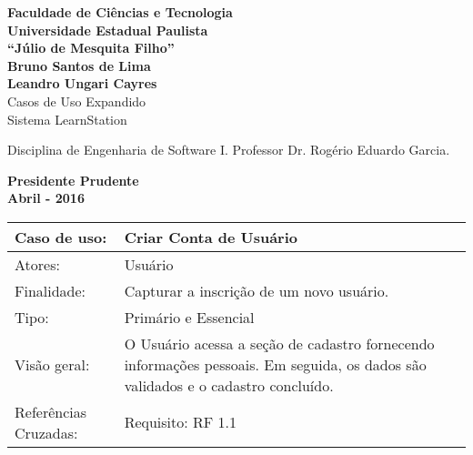 \documentclass[12pt,a4paper,onecolumn,titlepage]{article}
\begin{document}

\begin{titlepage} %
	
	\vfill
	\begin{center}
	
		{\large \textbf{Faculdade de Ciências e Tecnologia\\Universidade Estadual Paulista\\``Júlio de Mesquita Filho''}} \\[3cm]
		{\large \textbf{Bruno Santos de Lima}}\\
		{\large \textbf{Leandro Ungari Cayres}}\\[4cm]
		{\Large Casos de Uso Expandido}\\
		{\Large Sistema LearnStation}\\[4cm]

	\hspace{.45\textwidth} %
	\begin{minipage}{.5\textwidth}
		\large Disciplina de Engenharia de Software I. Professor Dr. Rogério Eduardo Garcia.\\[0.5cm]
	\end{minipage}

	\vfill
	\vspace{1.5cm}
	
	\large \textbf{Presidente Prudente\\}
	\large \textbf{Abril - 2016}
	
	\end{center}
	
\end{titlepage}

\renewcommand{\baselinestretch}{1.1}


\begin{table}[h!]
\begin{center}
\begin{tabular}{p{2.5cm} p{9.5cm}}
Caso de uso: & \textbf{Criar Conta de Usuário} \\ \hline
Atores: & Usuário \\ \hline
Finalidade: & Capturar a inscrição de um novo usuário. \\ \hline
Tipo: & Primário e Essencial\\ \hline
Visão geral: & O Usuário acessa a seção de cadastro fornecendo informações pessoais. Em seguida, os dados são validados e o cadastro concluído. \\ \hline
Referências Cruzadas: & Requisito: RF 1.1

\end{tabular}
\end{center}
\end{table}
\end{document}
